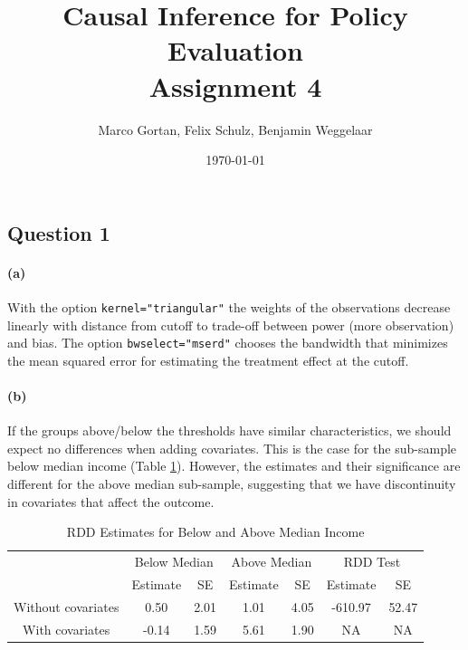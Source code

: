 \documentclass{scrartcl}
\title{Causal Inference for Policy Evaluation\\
\Large{Assignment 4}}
\author{Marco Gortan, Felix Schulz, Benjamin Weggelaar}
\date{\today}
\begin{document}
\maketitle



\subsection*{Question 1}

\paragraph*{(a)}
With the option \texttt{kernel="triangular"} the weights of the observations decrease linearly with distance from cutoff to trade-off between power (more observation) and bias. The option \texttt{bwselect="mserd"} chooses the bandwidth that minimizes the mean squared error for estimating the treatment effect at the cutoff.

\paragraph*{(b)}
If the groups above/below the thresholds have similar characteristics, we should expect no differences when adding covariates. This is the case for the sub-sample below median income (Table \ref{tab:Ex1ab}). However, the estimates and their significance are different for the above median sub-sample, suggesting that we have discontinuity in covariates that affect the outcome.

\begin{table}

\caption{\label{tab:tab:rdd_results}RDD Estimates for Below and Above Median Income}
\centering
\begin{tabular}[t]{ccccccc}
\toprule
\multicolumn{1}{c}{ } & \multicolumn{2}{c}{Below Median} & \multicolumn{2}{c}{Above Median} & \multicolumn{2}{c}{RDD Test} \\
\cmidrule(l{3pt}r{3pt}){2-3} \cmidrule(l{3pt}r{3pt}){4-5} \cmidrule(l{3pt}r{3pt}){6-7}
 & Estimate & SE & Estimate & SE & Estimate & SE\\
\midrule
Without covariates & 0.50 & 2.01 & 1.01 & 4.05 & -610.97 & 52.47\\
With covariates & -0.14 & 1.59 & 5.61 & 1.90 & NA & NA\\
\bottomrule
\end{tabular}
\label{tab:Ex1ab}
\end{table}
\end{document}
